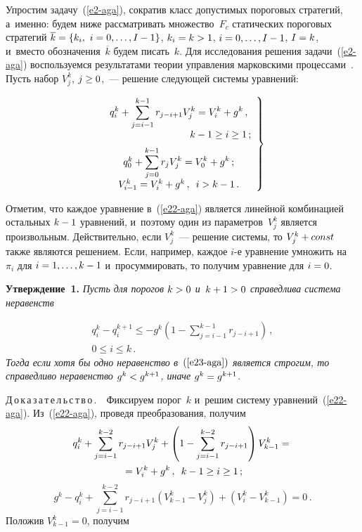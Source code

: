 \begin{multicols}{2}
  Упростим задачу~(\ref{e2-aga}), сократив класс допустимых пороговых
стратегий, а~именно: будем ниже рассматривать множество~$F_c$ статических
пороговых стратегий $\overline{k}\hm= \{ k_i,\ i\hm= 0,\ldots , I-1\}$, $k_i\hm=
k\hm>1$, $i\hm= 0,\ldots, I-1$, $I\hm=k$, и~вместо обозначения~$\overline{k}$
будем писать~$k$. Для исследования решения задачи~(\ref{e2-aga})
воспользуемся результатами теории управления марковскими
процессами~\cite{8-aga}. Пусть набор $V_j^k$, $j\hm\geq0$,~--- решение
следующей системы уравнений:

\noindent
  \begin{equation}
  \left.
  \begin{array}{c}
 \displaystyle q_i^k +\sum\limits_{j=i-1}^{k-1} r_{j-i+1} V_j^k= V_i^k +g^k\,,\\[6pt]
 \hspace*{30mm}k-1\geq i\geq 1\,;\\[6pt]
 q_0^k+ \displaystyle\sum\limits_{j=0}^{k-1} r_j V_j^k =V_0^k +g^k\,;\\[9pt]
  V_{i-1}^k = V_i^k +g^k\,,\enskip i>k-1\,.
  \end{array}
  \right\}
    \label{e22-aga}
  \end{equation}

  Отметим, что каждое уравнение в~(\ref{e22-aga}) является линейной
комбинацией остальных $k\hm-1$ уравнений, и~поэтому один из
параметров~$V_j^k$ является произвольным. Действительно, если $V_j^k$~---
решение системы, то $V_j^k\hm+const$ также являются решением. Если,
например, каждое $i$-е уравнение умножить на~$\pi_i$ для $i\hm= 1,\ldots,
k\hm-1$ и~просуммировать, то получим уравнение для $i\hm=0$.

  \smallskip

  \noindent
  \textbf{Утверждение~1.} \textit{Пусть для порогов $k\hm>0$ и~$k\hm+1\hm>0$ 
  справедлива система неравенств}
  
  \noindent
  \begin{multline}
  q_i^k -q_i^{k+1} \leq -g^k \left( 1-\sum\limits_{j=i-1}^{k-1} r_{j-
i+1}\right)\,,\\ 
0\leq i\leq k\,.
  \label{e23-aga}
  \end{multline}
\textit{Тогда если хотя бы одно неравенство в~$(\ref{e23-aga})$ является
строгим, то справедливо неравенство $g^k\hm<g^{k+1}$, иначе} $g^k\hm=
g^{k+1}$.

\smallskip

\noindent
  Д\,о\,к\,а\,з\,а\,т\,е\,л\,ь\,с\,т\,в\,о\,.\ \ Фиксируем порог~$k$ и~решим
систему уравнений~(\ref{e22-aga}). Из~(\ref{e22-aga}), проведя
преобразования, получим
  \begin{multline*}
  q_i^k +\sum\limits_{j=i-1}^{k-2} r_{j-i+1} V_j^k + \left( 1-\sum\limits_{j=i-
1}^{k-2} r_{j-i+1}\right) V_{k-1}^k={}\\
  {}= V_i^k +g^k\,,\enskip k-1\geq i\geq1\,;
  \end{multline*}
  $$
  g^k -q_i^k +\sum\limits_{j=i-1}^{k-2} r_{j-i+1}\left( V^k_{k-1}-V_j^k\right)
+\left( V_i^k -V^k_{k-1}\right) =0\,.
  $$
Положив $V^k_{k-1}=0$, получим


\end{multicols}
